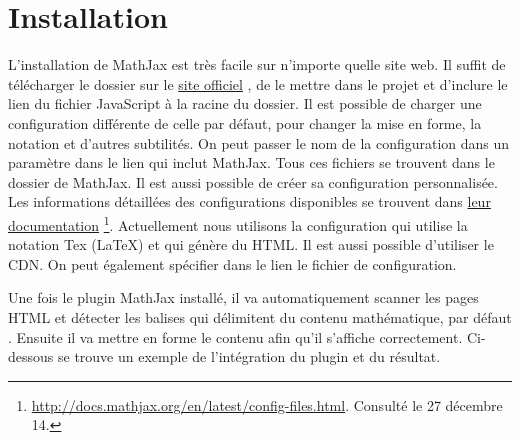 \documentclass[a4paper,10pt,twoside]{sphinxmanual}
\begin{document}
\section{Installation}
\label{maths:installation}
L'installation de MathJax est très facile sur n'importe quelle site web. Il suffit de télécharger le dossier sur le \href{http://mathjax.org}{site officiel} \footnotemark[1], de le mettre dans le projet et d'inclure le lien du fichier JavaScript  à la racine du dossier. Il est possible de charger une configuration différente de celle par défaut, pour changer la mise en forme, la notation et d'autres subtilités. On peut passer le nom de la configuration dans un paramètre  dans le lien qui inclut MathJax. Tous ces fichiers se trouvent dans le dossier  de MathJax. Il est aussi possible de créer sa configuration personnalisée. Les informations détaillées des configurations disponibles se trouvent dans \href{http://docs.mathjax.org/en/latest/config-files.html}{leur documentation} \footnote{
\href{http://docs.mathjax.org/en/latest/config-files.html}{http://docs.mathjax.org/en/latest/config-files.html}.  Consulté le 27 décembre 14.
}. Actuellement nous utilisons la configuration  qui utilise la notation Tex (LaTeX) et qui génère du HTML. Il est aussi possible d'utiliser le CDN. On peut également spécifier dans le lien le fichier de configuration.

Une fois le plugin MathJax installé, il va automatiquement scanner les pages HTML et détecter les balises qui délimitent du contenu mathématique, par défaut \code{\$\$}. Ensuite il va mettre en forme le contenu afin qu'il s'affiche correctement. Ci-dessous se trouve un exemple de l'intégration du plugin et du résultat.
\end{document}

